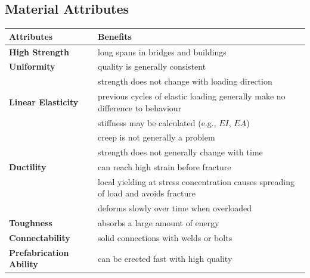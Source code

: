 \subsection{Material Attributes}
\begin{table}[H]
\centering
\begin{tabular}{l|m{10cm}}
	\toprule
	\textbf{Attributes}                  & \textbf{Benefits}                                                                   \\ \midrule
	\textbf{High Strength}               & long spans in bridges and buildings                                                 \\ \midrule
	\textbf{Uniformity}                  & quality is generally consistent                                                     \\
	                                     & strength does not change with loading direction                                     \\ \midrule
	\textbf{Linear Elasticity}           & previous cycles of elastic loading generally make no difference to behaviour        \\
	                                     & stiffness may be calculated (e.g., $EI$, $EA$)                                      \\
	                                     & creep is not generally a problem                                                    \\
	                                     & strength does not generally change with time                                        \\ \midrule
	\textbf{Ductility}                   & can reach high strain before fracture                                               \\
	                                     & local yielding at stress concentration causes spreading of load and avoids fracture \\
	                                     & deforms slowly over time when overloaded                                            \\ \midrule
	\textbf{Toughness}                   & absorbs a large amount of energy                                                    \\ \midrule
	\textbf{Connectability}              & solid connections with welds or bolts                                               \\ \midrule
	\textbf{Prefabrication Ability}      & can be erected fast with high quality                                               \\

\end{tabular}
\end{table}
